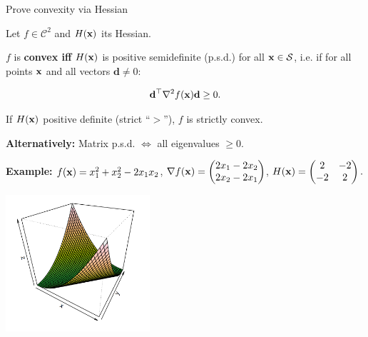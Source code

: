\begin{vbframe}{Prove convexity via Hessian}

Let $f \in \mathcal{C}^2$ and $H(\mathbf{x})$ its Hessian.

\lz 

$f$ is \textbf{convex iff} $H(\mathbf{x})$ is positive semidefinite (p.s.d.) for all $\mathbf{x} \in \mathcal{S}$, i.e. if for all points $\mathbf{x}$ and all vectors $\mathbf{d} \ne 0$:

$$
\mathbf{d}^{\top} \nabla^2f(\mathbf{x})\mathbf{d} \ge 0.
$$

If $H(\mathbf{x})$ positive definite (strict \enquote{$>$}), $f$ is strictly convex.

\lz

\textbf{Alternatively:} Matrix p.s.d. $\Leftrightarrow$ all eigenvalues $\ge 0$. 


\framebreak



\begin{footnotesize}
\textbf{Example:} $f(\mathbf{x}) = x_1^2 + x_2^2 - 2x_1x_2$, $\nabla f(\mathbf{x}) = \begin{pmatrix}2x_1 - 2x_2 \\ 2x_2 - 2x_1\end{pmatrix}$, $H(\mathbf{x}) = \begin{pmatrix} 2 & -2 \\ -2 & 2 \end{pmatrix}. 
$

\begin{center}
  \includegraphics[width = 0.4\textwidth]{figure_man/convex-example.png}
\end{center}


\end{footnotesize}
\end{vbframe}
